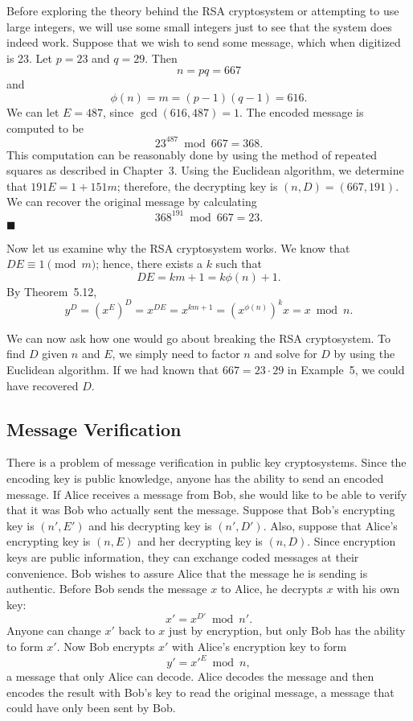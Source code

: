  
\vspace{2 ex}
 
 
Before exploring the theory behind the RSA cryptosystem or attempting
to use large integers, we will use some small integers just to see
that the system does indeed work. Suppose that we wish to send some
message, which when digitized is 23. Let $p = 23$ and $q = 29$. Then 
$$
n = pq = 667
$$
and
$$
\phi(n) = m = (p - 1)(q - 1) = 616.
$$
We can let $E = 487$, since $\gcd(616, 487) = 1$. The encoded message
is computed to be  
$$
23^{487} \bmod 667 = 368.
$$
This computation can be reasonably done by using the method of
repeated squares as described in Chapter~3. Using the Euclidean
algorithm, we determine that $191 E = 1 + 151 m$; therefore, the
decrypting key is $(n, D) = ( 667, 191)$. We can recover the original 
message by calculating  
$$
368^{191} \bmod 667 = 23.
$$
\hspace{\fill} $\blacksquare$
 
 
\vspace{ 2 ex}
 
 
Now let us examine why the RSA cryptosystem works.  We know that $DE
\equiv 1 \pmod{ m}$; hence, there exists a $k$ such that 
$$
DE = km + 1 = k \phi(n) + 1.
$$
By Theorem~5.12,
$$
y^D = (x^E)^D = x^{DE} = x^{km+1} = (x^{\phi(n)})^k x = x \bmod n.
$$
 
 
We can now ask how one would go about breaking the RSA cryptosystem.
To find $D$ given $n$ and $E$, we simply need to factor $n$ and solve
for $D$ by using the Euclidean algorithm. If we had known that $667 =
23 \cdot 29$ in Example~5, we could have recovered $D$.    
 
 
 
\subsection*{Message Verification}
 
 
There is a problem of message verification in public key
cryptosystems. Since the encoding key is public knowledge, anyone has
the ability to send an encoded message.  If Alice receives a message
from Bob, she would like to be able to verify that it was Bob who
actually sent the message. Suppose that Bob's encrypting key is $(n',
E')$ and his decrypting key is $(n', D')$.  Also, suppose that Alice's
encrypting key is $(n, E)$ and her decrypting key is $(n, D)$.  Since
encryption keys are public information, they can exchange coded
messages at their convenience.  Bob wishes to assure Alice that the
message he is sending is authentic. Before Bob sends the message $x$
to Alice, he decrypts  $x$ with his own key:
$$
x' = x ^{D'} \bmod n'.
$$
Anyone can change $x'$ back to $x$ just by encryption, but only Bob
has the ability to form $x'$. Now Bob encrypts $x'$ with Alice's
encryption key to form 
$$
y' = {x'}^E  \bmod n,
$$
a message that only Alice can decode.  Alice decodes the message and
then encodes the result with Bob's key to read the original message, a
message that could have only been sent by Bob.
 
